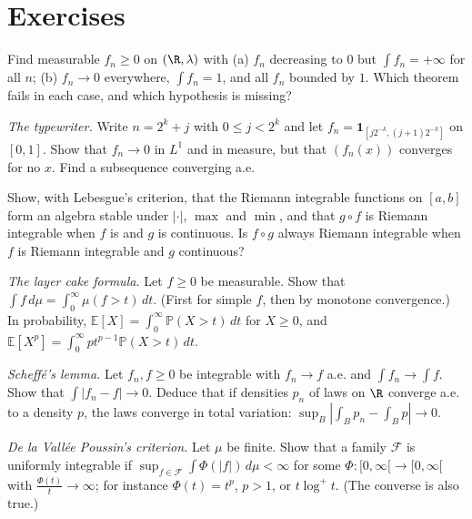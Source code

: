 \section{Exercises}

\begin{exercise}[$\star$]\label{ex:fatoustrict}
Find measurable $f_n\ge0$ on $(\R,\lambda)$ with (a) $f_n$ decreasing to $0$ but $\int f_n=+\infty$ for all $n$; (b) $f_n\to0$ everywhere, $\int f_n=1$, and all $f_n$ bounded by $1$. Which theorem
fails in each case, and which hypothesis is missing?
\end{exercise}

\begin{exercise}[$\star$]\label{ex:typewriter}
\emph{The typewriter.} Write $n=2^k+j$ with $0\le j<2^k$ and let $f_n=\mathbf 1_{[j2^{-k},(j+1)2^{-k}]}$ on $[0,1]$. Show that $f_n\to0$ in $L^1$ and in measure, but that $(f_n(x))$ converges for no $x$. Find a
subsequence converging a.e.
\end{exercise}

\begin{exercise}[$\star$]\label{ex:riemannalgebra}
Show, with Lebesgue's criterion, that the Riemann integrable functions on $[a,b]$ form an algebra stable under $|\cdot|$, $\max$ and $\min$, and that $g\circ f$ is Riemann integrable
when $f$ is and $g$ is continuous. Is $f\circ g$ always Riemann integrable when $f$ is Riemann integrable and $g$ continuous?
\end{exercise}

\begin{exercise}[$\star\star$]\label{ex:layercake}
\emph{The layer cake formula.} Let $f\ge0$ be measurable. Show that $\int f\,d\mu=\int_0^\infty\mu(f>t)\,dt$. (First for simple $f$, then by monotone convergence.) In probability,
$\mathbb E[X]=\int_0^\infty\mathbb P(X>t)\,dt$ for $X\ge0$, and $\mathbb E[X^p]=\int_0^\infty pt^{p-1}\mathbb P(X>t)\,dt$.
\end{exercise}

\begin{exercise}[$\star\star$]\label{ex:scheffe}
\emph{Scheff\'e's lemma.} Let $f_n,f\ge0$ be integrable with $f_n\to f$ a.e. and $\int f_n\to\int f$. Show that $\int|f_n-f|\to0$. Deduce that if densities $p_n$ of laws on $\R$ converge a.e. to a
density $p$, the laws converge in total variation: $\sup_B|\int_Bp_n-\int_Bp|\to0$.
\end{exercise}

\begin{exercise}[$\star\star$]\label{ex:vallee}
\emph{De la Vall\'ee Poussin's criterion.} Let $\mu$ be finite. Show that a family $\mathcal F$ is uniformly integrable if $\sup_{f\in\mathcal F}\int\Phi(|f|)\,d\mu<\infty$ for some $\Phi:[0,\infty[\to[0,\infty[$ with
$\frac{\Phi(t)}t\to\infty$; for instance $\Phi(t)=t^p$, $p>1$, or $t\log^+t$. (The converse is also true.)
\end{exercise}

